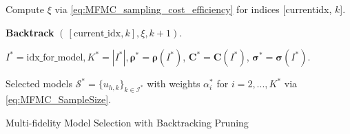 \begin{algorithm}[!ht]
{{{     %

     

        
        Compute $\xi$ via \eqref{eq:MFMC_sampling_cost_efficiency} for indices  
      [current\textunderscore idx, $k$].

      
      \textbf{Backtrack} $(\, [\text{current}\_\text{idx},k],\xi, k+1)$.
  }
}
}
\vspace{3mm} 


 
$I^* = \text{idx}\_\text{for}\_\text{model}, K^* = |I^*|, \boldsymbol{\rho}^* = \boldsymbol{\rho} (I^*)$, $\boldsymbol{C}^* = \boldsymbol{C} (I^*)$, $\boldsymbol{\sigma}^* = \boldsymbol{\sigma} (I^*)$.

Selected models $\mathcal{S}^* = \{u_{h,k}\}_{k\in \mathcal{I^*}}$ with weights $\alpha_i^*$ for $i=2,...,K^*$ via \eqref{eq:MFMC_SampleSize}.




\caption{Multi-fidelity Model Selection with Backtracking Pruning}
\end{algorithm}
\ULforem




